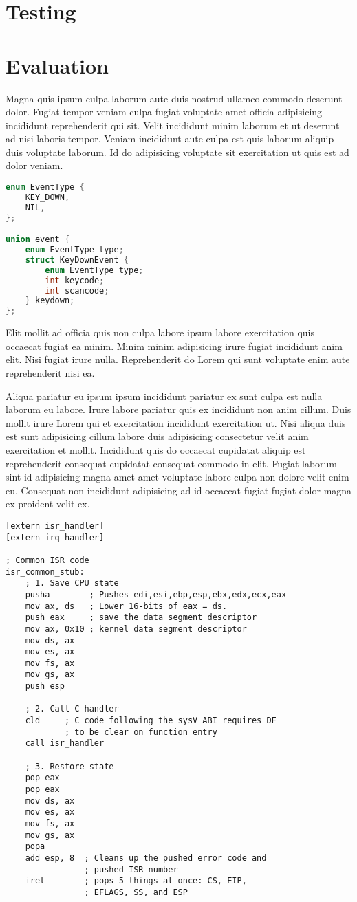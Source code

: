 \documentclass{article}
\begin{document}
\section{Testing}
\section{Evaluation}


Magna quis ipsum culpa laborum aute duis nostrud ullamco commodo deserunt dolor. Fugiat tempor veniam culpa fugiat voluptate amet officia adipisicing incididunt reprehenderit qui sit. Velit incididunt minim laborum et ut deserunt ad nisi laboris tempor. Veniam incididunt aute culpa est quis laborum aliquip duis voluptate laborum. Id do adipisicing voluptate sit exercitation ut quis est ad dolor veniam.

\begin{lstlisting}[language=C]
enum EventType {
	KEY_DOWN,
	NIL,
};

union event {
	enum EventType type;
	struct KeyDownEvent {
		enum EventType type;
		int keycode;
		int scancode;
	} keydown;
};
\end{lstlisting}

Elit mollit ad officia quis non culpa labore ipsum labore exercitation quis occaecat fugiat ea minim. Minim minim adipisicing irure fugiat incididunt anim elit. Nisi fugiat irure nulla. Reprehenderit do Lorem qui sunt voluptate enim aute reprehenderit nisi ea.

Aliqua pariatur eu ipsum ipsum incididunt pariatur ex sunt culpa est nulla laborum eu labore. Irure labore pariatur quis ex incididunt non anim cillum. Duis mollit irure Lorem qui et exercitation incididunt exercitation ut. Nisi aliqua duis est sunt adipisicing cillum labore duis adipisicing consectetur velit anim exercitation et mollit. Incididunt quis do occaecat cupidatat aliquip est reprehenderit consequat cupidatat consequat commodo in elit. Fugiat laborum sint id adipisicing magna amet amet voluptate labore culpa non dolore velit enim eu. Consequat non incididunt adipisicing ad id occaecat fugiat fugiat dolor magna ex proident velit ex.

\begin{lstlisting}[language={[x86masm]Assembler}]
[extern isr_handler]
[extern irq_handler]

; Common ISR code
isr_common_stub:
    ; 1. Save CPU state
	pusha 		 ; Pushes edi,esi,ebp,esp,ebx,edx,ecx,eax
	mov ax, ds   ; Lower 16-bits of eax = ds.
	push eax	 ; save the data segment descriptor
	mov ax, 0x10 ; kernel data segment descriptor
	mov ds, ax
	mov es, ax
	mov fs, ax
	mov gs, ax
    push esp
	
    ; 2. Call C handler
    cld 	; C code following the sysV ABI requires DF 
			; to be clear on function entry
	call isr_handler
	
    ; 3. Restore state
    pop eax
	pop eax 
	mov ds, ax
	mov es, ax
	mov fs, ax
	mov gs, ax
	popa
	add esp, 8 	; Cleans up the pushed error code and 
				; pushed ISR number
	iret 		; pops 5 things at once: CS, EIP, 
				; EFLAGS, SS, and ESP
\end{lstlisting}
\end{document}
